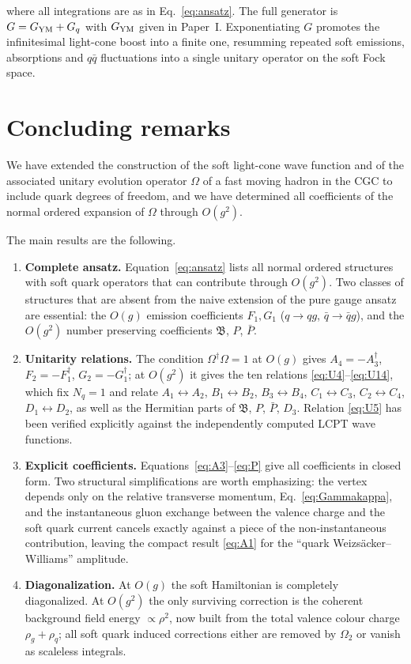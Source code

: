 \documentclass[11pt]{article}
\newcommand{\dg}{\dagger}
\newcommand{\OM}{\Omega}
\begin{document}
where all integrations are as in Eq.~\eqref{eq:ansatz}. The full generator is $G=G_{\rm YM}+G_q$
with $G_{\rm YM}$ given in Paper~I. Exponentiating $G$ promotes the infinitesimal light-cone boost
into a finite one, resumming repeated soft emissions, absorptions and $q\bar q$ fluctuations into a
single unitary operator on the soft Fock space.

\section{Concluding remarks}
\label{sec:concl}

We have extended the construction of the soft light-cone wave function and of the associated
unitary evolution operator $\OM$ of a fast moving hadron in the CGC to include quark degrees of
freedom, and we have determined all coefficients of the normal ordered expansion of $\OM$ through
$O(g^2)$.

The main results are the following.
\begin{enumerate}
\item {\bf Complete ansatz.} Equation~\eqref{eq:ansatz} lists all normal ordered structures with
soft quark operators that can contribute through $O(g^2)$. Two classes of structures that are
absent from the naive extension of the pure gauge ansatz are essential: the $O(g)$ emission
coefficients $F_1,G_1$ ($q\to qg$, $\bar q\to\bar q g$), and the $O(g^2)$ number preserving
coefficients $\mathfrak B$, $P$, $\bar P$.
\item {\bf Unitarity relations.} The condition $\OM^\dg\OM=1$ at $O(g)$ gives
$A_4=-A_3^\dg$, $F_2=-F_1^\dg$, $G_2=-G_1^\dg$; at $O(g^2)$ it gives the ten relations
\eqref{eq:U4}--\eqref{eq:U14}, which fix $N_q=1$ and relate $A_1\leftrightarrow A_2$,
$B_1\leftrightarrow B_2$, $B_3\leftrightarrow B_4$, $C_1\leftrightarrow C_3$,
$C_2\leftrightarrow C_4$, $D_1\leftrightarrow D_2$, as well as the Hermitian parts of
$\mathfrak B$, $P$, $\bar P$, $D_3$. Relation \eqref{eq:U5} has been verified explicitly against
the independently computed LCPT wave functions.
\item {\bf Explicit coefficients.} Equations~\eqref{eq:A3}--\eqref{eq:P} give all coefficients in
closed form. Two structural simplifications are worth emphasizing: the vertex depends only on the
relative transverse momentum, Eq.~\eqref{eq:Gammakappa}, and the instantaneous gluon exchange
between the valence charge and the soft quark current cancels exactly against a piece of the
non-instantaneous contribution, leaving the compact result \eqref{eq:A1} for the ``quark
Weizs\"acker--Williams'' amplitude.
\item {\bf Diagonalization.} At $O(g)$ the soft Hamiltonian is completely diagonalized. At $O(g^2)$
the only surviving correction is the coherent background field energy $\propto\rho^2$, now built
from the total valence colour charge $\rho_g+\rho_q$; all soft quark induced corrections either
are removed by $\OM_2$ or vanish as scaleless integrals.
\end{enumerate}
\end{document}
